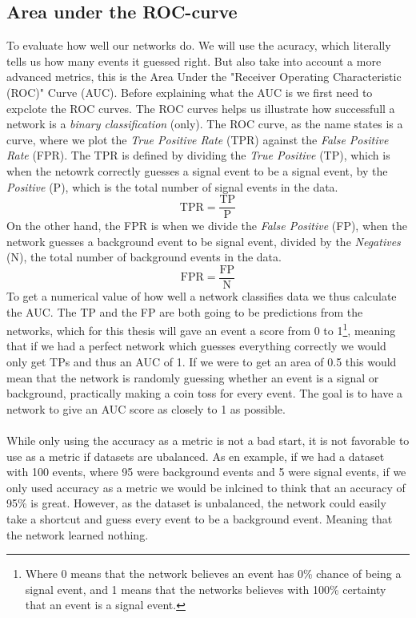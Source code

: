 \documentclass[12pt, a4paper]{book}
\begin{document}
\subsection{Area under the ROC-curve}
To evaluate how well our networks do. We will use the acuracy, which literally tells us how many events it guessed right. But also take into account a more advanced metrics, this is the Area Under the "Receiver Operating Characteristic (ROC)" Curve (AUC). 
Before explaining what the AUC is we first need to expclote the ROC curves. The ROC curves helps us illustrate how successfull a network is a \textit{binary classification} (only). The ROC curve, as the name states is a curve, where we plot the \textit{True Positive Rate} (TPR) against 
the \textit{False Positive Rate} (FPR). The TPR is defined by dividing the \textit{True Positive} (TP), which is when the netowrk correctly guesses a signal event to be a signal event, by the \textit{Positive} (P), which is the total number of signal events in the data. 
$$
\text{TPR} =\frac{\text{TP}}{\text{P}}
$$
On the other hand, the FPR is when we divide the \textit{False Positive} (FP), when the network guesses a background event to be signal event, divided by the \textit{Negatives} (N), the total number of background events in the data.
$$
\text{FPR} =\frac{\text{FP}}{\text{N}}
$$
To get a numerical value of how well a network classifies data we thus calculate the AUC. The TP and the FP are both going to be predictions from the networks, which for this thesis will gave an event a score from 0 to 1\footnote{Where 0 means that the network believes an event has 0\% chance of being a signal event, and 1 means that the networks believes with 100\% certainty that an event is a signal event.}, 
meaning that if we had a perfect network which guesses everything correctly we would only get TPs and thus an AUC of 1. If we were to get an area of 0.5 this would mean that the network is randomly guessing whether an event is a signal or background, practically making a coin toss for every event. 
The goal is to have a network to give an AUC score as closely to 1 as possible. \\
\\While only using the accuracy as a metric is not a bad start, it is not favorable to use as a metric if datasets are ubalanced. As en example, if we had a dataset with 100 events, where 95 were background events and 5 were signal events, if we only used accuracy as a metric we would 
be inlcined to think that an accuracy of 95\% is great. However, as the dataset is unbalanced, the network could easily take a shortcut and guess every event to be a background event. Meaning that the network learned nothing.
\end{document}
